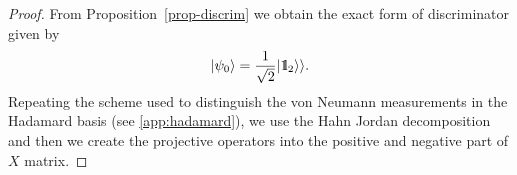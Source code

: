 \documentclass[preprint,12pt, a4paper, dvipsnames]{elsarticle}
\newcommand{\ket}[1]{\ensuremath{|#1\rangle}}
\newcommand{\bra}[1]{\ensuremath{\langle#1|}}
\newcommand{\ketbra}[2]{\ensuremath{\ket{#1}\bra{#2}}}
\newcommand{\proj}[1]{\ensuremath{\ketbra{#1}{#1}}}
\newcommand{\1}{{\rm 1\hspace{-0.9mm}l}}
\newcommand{\Id}{{\rm 1\hspace{-0.9mm}l}}
\newcommand{\PP}{\mathcal{P}}
\begin{document}
\begin{proof}
	From Proposition~\ref{prop-discrim} we obtain the exact form of discriminator given by
	\begin{equation}
	\ket{\psi_0}  = \frac{1}{\sqrt{2}} |\Id_2
	\rangle \rangle.
	\end{equation}
	Repeating the scheme used to distinguish the von Neumann measurements in the Hadamard basis (see \ref{app:hadamard}), we use the Hahn Jordan decomposition and then we create the projective operators into the positive and negative part of $X$ matrix.
%	
%	
%	

\end{proof}
\end{document}
